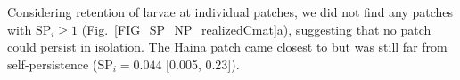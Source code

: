 \documentclass[12pt, oneside]{article}   	%
\begin{document}

Considering retention of larvae at individual patches, we did not find any patches with $\text{SP}_{i} \geq 1$ (Fig.\ \ref{FIG_SP_NP_realizedCmat}a), suggesting that no patch could persist in isolation. The Haina patch came closest to but was still far from self-persistence ($\text{SP}_i = 0.044$ [0.005, 0.23]). %


\end{document}
